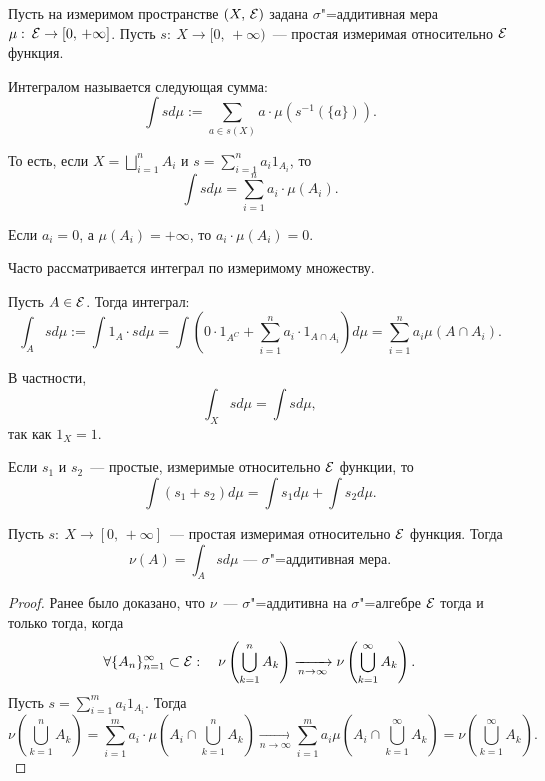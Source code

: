 Пусть на измеримом пространстве $(X,\, \mathcal{E})$ задана $\sigma$"=аддитивная мера $\mu:\: \mathcal{E}\to[0,\,+\infty]$.
Пусть $s:\: X\to[0,\, +\infty)$~--- простая измеримая относительно $\mathcal{E}$ функция.

\begin{definition}
    Интегралом называется следующая сумма:
    \[
        \int sd\mu:=\sum_{a\in s(X)}a\cdot\mu\left(s^{-1}(\{a\})\right).
    \]

    То есть, если $X=\bigsqcup\limits_{i=1}^n A_i$ и $s=\sum\limits_{i=1}^n a_i 1_{A_i}$, то
    \[
        \int sd\mu=\sum_{i=1}^n a_i\cdot\mu(A_i).
    \]

    \begin{remark}
        Если $a_i=0$, а $\mu(A_i)=+\infty$, то $a_i\cdot\mu(A_i)=0$.
    \end{remark}
\end{definition}

Часто рассматривается интеграл по измеримому множеству.
\begin{definition}
    Пусть $A\in\mathcal{E}$. Тогда интеграл:
    \[
        \int_{A}sd\mu:=\int 1_A\cdot s d\mu=\int\left(0\cdot 1_{A^C}+
        \sum_{i=1}^n a_i\cdot 1_{A\cap A_i}\right)d\mu=\sum_{i=1}^n a_i\mu(A\cap A_i).
    \]

    \begin{remark}
        В частности, \[
            \int_X sd\mu=\int sd\mu,
        \]
        так как $1_X=1$.
    \end{remark}
\end{definition}

\begin{claim}
    Если $s_1$ и $s_2$~--- простые, измеримые относительно $\mathcal{E}$ функции, то
    \[
        \int(s_1+s_2)d\mu=\int s_1d\mu+\int s_2d\mu.
    \]
\end{claim}

\begin{claim}
    Пусть $s:\: X\to[0,\, +\infty]$~--- простая измеримая относительно $\mathcal{E}$ функция.
    Тогда \[
        \nu(A)=\int_A sd\mu\text{~--- $\sigma$"=аддитивная мера.}
    \]

    \begin{proof}

        Ранее было доказано, что $\nu$~--- $\sigma$"=аддитивна на $\sigma$"=алгебре $\mathcal{E}$ тогда и только тогда, когда \[
            \forall\{A_n\}_{n=1}^{\infty}\subset\mathcal{E}:\quad \nu\left(\bigcup_{k=1}^{n}A_k\right)
            \xrightarrow[n\to\infty]{}\nu\left(\bigcup_{k=1}^{\infty}A_k\right).
        \]
        Пусть $s=\sum\limits_{i=1}^m a_i1_{A_i}.$
        Тогда \[
            \nu\left(\bigcup_{k=1}^n A_k\right)=\sum_{i=1}^m a_i\cdot\mu\left(A_i\cap\bigcup_{k=1}^nA_k\right)
            \xrightarrow[n\to\infty]{}\sum_{i=1}^m a_i\mu\left(A_i\cap\bigcup_{k=1}^{\infty}A_k\right)=
            \nu\left(\bigcup_{k=1}^{\infty}A_k\right).
        \]

    \end{proof}
\end{claim}

